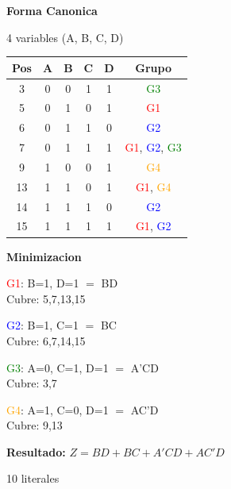 \documentclass[12pt,a4paper]{article}
\begin{document}
\begin{minipage}[t]{0.58\textwidth}
\textbf{Forma Canonica}

4 variables (A, B, C, D)

\begin{tabular}{|c|c|c|c|c|c|}
\hline
Pos & A & B & C & D & Grupo \\
\hline
3  & 0 & 0 & 1 & 1 & \textcolor{green}{G3} \\
5  & 0 & 1 & 0 & 1 & \textcolor{red}{G1} \\
6  & 0 & 1 & 1 & 0 & \textcolor{blue}{G2} \\
7  & 0 & 1 & 1 & 1 & \textcolor{red}{G1}, \textcolor{blue}{G2}, \textcolor{green}{G3} \\
9  & 1 & 0 & 0 & 1 & \textcolor{orange}{G4} \\
13 & 1 & 1 & 0 & 1 & \textcolor{red}{G1}, \textcolor{orange}{G4} \\
14 & 1 & 1 & 1 & 0 & \textcolor{blue}{G2} \\
15 & 1 & 1 & 1 & 1 & \textcolor{red}{G1}, \textcolor{blue}{G2} \\
\hline
\end{tabular}
\end{minipage}
\hspace{0.3cm}
\begin{minipage}[t]{0.38\textwidth}
\textbf{Minimizacion}

\vspace{0.2cm}
\textcolor{red}{G1}: B=1, D=1 $=$ BD \\ Cubre: 5,7,13,15

\vspace{0.2cm}
\textcolor{blue}{G2}: B=1, C=1 $=$ BC \\ Cubre: 6,7,14,15

\vspace{0.2cm}
\textcolor{green}{G3}: A=0, C=1, D=1 $=$ A'CD \\ Cubre: 3,7

\vspace{0.2cm}
\textcolor{orange}{G4}: A=1, C=0, D=1 $=$ AC'D \\ Cubre: 9,13

\vspace{0.3cm}
\textbf{Resultado:} $Z = BD + BC + A'CD + AC'D$

10 literales
\end{minipage}

\vspace{0.5cm}
\end{document}
